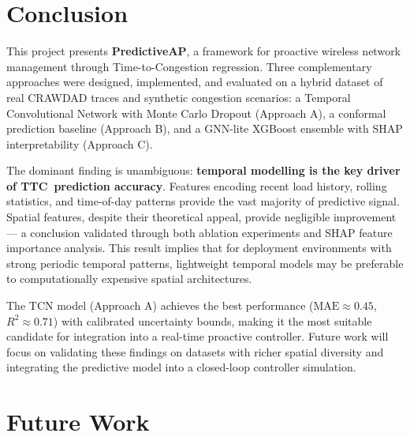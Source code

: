 \documentclass[12pt,a4paper]{article}
\newcommand{\ttc}{\textsc{TTC}}
\newcommand{\predap}{\textbf{PredictiveAP}}
\begin{document}
\section{Conclusion}
\label{sec:conclusion}

This project presents \predap, a framework for proactive wireless network management through Time-to-Congestion regression. Three complementary approaches were designed, implemented, and evaluated on a hybrid dataset of real CRAWDAD traces and synthetic congestion scenarios: a Temporal Convolutional Network with Monte Carlo Dropout (Approach A), a conformal prediction baseline (Approach B), and a GNN-lite XGBoost ensemble with SHAP interpretability (Approach C).

The dominant finding is unambiguous: \textbf{temporal modelling is the key driver of \ttc\ prediction accuracy}. Features encoding recent load history, rolling statistics, and time-of-day patterns provide the vast majority of predictive signal. Spatial features, despite their theoretical appeal, provide negligible improvement — a conclusion validated through both ablation experiments and SHAP feature importance analysis. This result implies that for deployment environments with strong periodic temporal patterns, lightweight temporal models may be preferable to computationally expensive spatial architectures.

The TCN model (Approach A) achieves the best performance ($\text{MAE} \approx 0.45$, $R^2 \approx 0.71$) with calibrated uncertainty bounds, making it the most suitable candidate for integration into a real-time proactive controller. Future work will focus on validating these findings on datasets with richer spatial diversity and integrating the predictive model into a closed-loop controller simulation.

\section{Future Work}
\label{sec:futurework}
\end{document}
